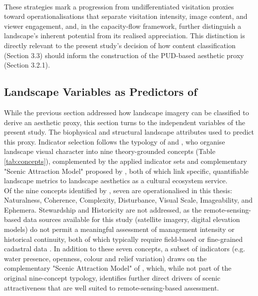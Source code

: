 \documentclass[hidelinks, 11pt]{article}
\begin{document}
\\
These strategies mark a progression from undifferentiated visitation proxies toward operationalisations that separate visitation intensity, image content, and viewer engagement, and, in the capacity-flow framework, further distinguish a landscape's inherent potential from its realised appreciation. This distinction is directly relevant to the present study's decision of how content classification (Section 3.3) should inform the construction of the PUD-based aesthetic proxy (Section 3.2.1).


\subsection{Landscape Variables as Predictors of}
While the previous section addressed how landscape imagery can be classified to derive an aesthetic proxy, this section turns to the independent variables of the present study. The biophysical and structural landscape attributes used to predict this proxy. Indicator selection follows the typology of \citet{tveit_key_2006} and \citet{ode_capturing_2008}, who organise landscape visual character into nine theory-grounded concepts (Table \ref{tab:concepts}), complemented by the applied indicator sets and complementary "Scenic Attraction Model" proposed by \citet{frank_landscape_2017}, both of which link specific, quantifiable landscape metrics to landscape aesthetics as a cultural ecosystem service.
\\
Of the nine concepts identified by \citet{tveit_key_2006}, seven are operationalised in this thesis: Naturalness, Coherence, Complexity, Disturbance, Visual Scale, Imageability, and Ephemera. Stewardship and Historicity are not addressed, as the remote-sensing-based data sources available for this study (satellite imagery, digital elevation models) do not permit a meaningful assessment of management intensity or historical continuity, both of which typically require field-based or fine-grained cadastral data \citep{ode_capturing_2008}. In addition to these seven concepts, a subset of indicators (e.g. water presence, openness, colour and relief variation) draws on the complementary "Scenic Attraction Model" of \citet{frank_landscape_2017}, which, while not part of the original nine-concept typology, identifies further direct drivers of scenic attractiveness that are well suited to remote-sensing-based assessment.
\\
\end{document}
